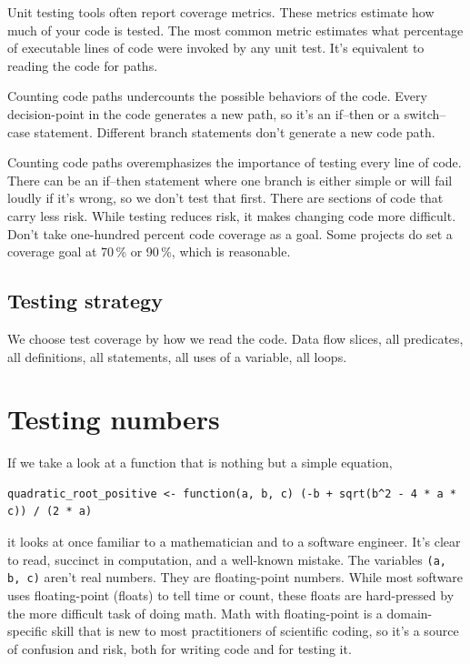 \documentclass[fleqn,10pt]{olplainarticle}
\begin{document}
Unit testing tools often report coverage metrics. These metrics
estimate how much of your code is tested. The most common metric
estimates what percentage of executable lines of code were invoked
by any unit test. It's equivalent to reading the code for paths.

Counting code paths undercounts the possible behaviors of the code.
Every decision-point in the code generates a new path, so it's an
if--then or a switch--case statement. Different branch statements
don't generate a new code path.

Counting code paths overemphasizes the importance of testing every
line of code. There can be an if--then statement where one branch
is either simple or will fail loudly if it's wrong, so we don't test
that first.
There are sections of code that carry less risk.
While testing reduces risk, it makes changing code more difficult.
Don't take one-hundred percent code coverage as a goal. Some
projects do set a coverage goal at 70\,\% or 90\,\%, which is reasonable.


\subsection{Testing strategy}

We choose test coverage by how we read the code.
Data flow slices, all predicates, all definitions, all
statements, all uses of a variable, all loops.


\section{Testing numbers}\label{sec:ieee-numbers}

If we take a look at a function that is nothing but a simple equation,
\begin{lstlisting}
quadratic_root_positive <- function(a, b, c) (-b + sqrt(b^2 - 4 * a * c)) / (2 * a)
\end{lstlisting}
it looks at once familiar to a mathematician and to a software engineer.
It's clear to read, succinct in computation, and a well-known mistake.
The variables \lstinline|(a, b, c)| aren't real numbers. They are floating-point
numbers. While most software uses floating-point (floats) to tell time
or count, these floats are hard-pressed by the more difficult task of doing
math. Math with floating-point is a domain-specific skill that is new to
most practitioners of scientific coding, so it's a source of confusion and risk,
both for writing code and for testing it.
\end{document}
